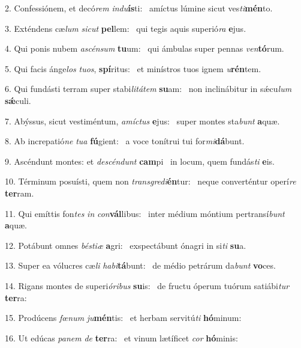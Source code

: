 2. Confessiónem, et decó\textit{rem} \textit{ind}\textit{u}\textbf{ís}ti: \ast\  amíctus lúmine sicut ves\textit{ti}\textbf{mén}to.\

3. Exténdens cæ\textit{lum} \textit{sic}\textit{ut} \textbf{pel}lem: \ast\  qui tegis aquis superió\textit{ra} \textbf{e}jus.\

4. Qui ponis nubem \textit{a}\textit{scén}\textit{sum} \textbf{tu}um: \ast\  qui ámbulas super pennas \textit{ven}\textbf{tó}rum.\

5. Qui facis ánge\textit{los} \textit{tu}\textit{os}, \textbf{spí}ritus: \ast\  et minístros tuos ignem \textit{u}\textbf{rén}tem.\

6. Qui fundásti terram super stabi\textit{li}\textit{tá}\textit{tem} \textbf{su}am: \ast\  non inclinábitur in sǽcu\textit{lum} \textbf{sǽ}culi.\

7. Abýssus, sicut vestiméntum, \textit{a}\textit{míc}\textit{tus} \textbf{e}jus: \ast\  super montes sta\textit{bunt} \textbf{a}quæ.\

8. Ab increpatió\textit{ne} \textit{tu}\textit{a} \textbf{fú}gient: \ast\  a voce tonítrui tui for\textit{mi}\textbf{dá}bunt.\

9. Ascéndunt montes: et \textit{de}\textit{scén}\textit{dunt} \textbf{cam}pi \ast\  in locum, quem fundás\textit{ti} \textbf{e}is.\

10. Términum posuísti, quem non \textit{trans}\textit{gre}\textit{di}\textbf{én}tur: \ast\  neque converténtur operí\textit{re} \textbf{ter}ram.\

11. Qui emíttis fon\textit{tes} \textit{in} \textit{con}\textbf{vál}libus: \ast\  inter médium móntium pertransí\textit{bunt} \textbf{a}quæ.\

12. Potábunt omnes \textit{bés}\textit{ti}\textit{æ} \textbf{a}gri: \ast\  exspectábunt ónagri in si\textit{ti} \textbf{su}a.\

13. Super ea vólucres cæ\textit{li} \textit{ha}\textit{bi}\textbf{tá}bunt: \ast\  de médio petrárum da\textit{bunt} \textbf{vo}ces.\

14. Rigans montes de superi\textit{ó}\textit{ri}\textit{bus} \textbf{su}is: \ast\  de fructu óperum tuórum satiábi\textit{tur} \textbf{ter}ra:\

15. Prodúcens \textit{fœ}\textit{num} \textit{ju}\textbf{mén}tis: \ast\  et herbam servitú\textit{ti} \textbf{hó}minum:\

16. Ut edúcas \textit{pa}\textit{nem} \textit{de} \textbf{ter}ra: \ast\  et vinum lætíficet \textit{cor} \textbf{hó}minis:\

